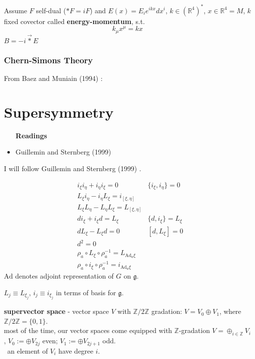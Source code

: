 \documentclass[10pt]{amsart}
\begin{document}
\begin{multicols*}{2}
Assume $F$ self-dual ($*F = iF$) and $E(x) = E_i e^{ikx} dx^i$, $k \in (\mathbb{R}^4)^*$, $x\in \mathbb{R}^4 = M$, $k$ fixed covector called \textbf{energy-momentum}, s.t. 
\[
k_{\mu} x^{\mu} = kx
\]
$B= -i \vec{*} E$




\section{Chern-Simons Theory}

From Baez and Muniain (1994) \cite{JBaezJMuniain1994}: 

\part{Supersymmetry}


\begin{itemize}
  \item [\textbf{Readings}]
  \item Guillemin and Sternberg (1999) \cite{GS1999}
\end{itemize}

I will follow Guillemin and Sternberg (1999) \cite{GS1999}.  

\begin{equation}
  \begin{aligned}
    & i_{\xi } i_{\eta} + i_{\eta} i_{\xi} = 0  \qquad \, & \lbrace i_{\xi} ,  i_{\eta} \rbrace =0  \\
    & L_{\xi} i_{\eta} - i_{\eta} L_{\xi} = i_{[\xi, \eta] } & \\
    & L_{\xi} L_{\eta} - L_{\eta} L_{\xi} = L_{[\xi, \eta] } & \\
    & d i_{\xi} + i_{\xi} d = L_{\xi } & \lbrace d,i_{\xi} \rbrace = L_{\xi} \\
    & dL_{\xi}  -  L_{\xi}d = 0 &  [d, L_{\xi} ] = 0 \\ 
    & d^2 = 0 & \\
    & \rho_a \circ L_{\xi} \circ \rho_a^{-1} = L_{\text{Ad}_a\xi}  & \\ 
    & \rho_a \circ i_{\xi} \circ \rho_a^{-1} = i_{\text{Ad}_a\xi}  & 
\end{aligned}
\end{equation}
$\text{Ad}$ denotes adjoint representation of $G$ on $\mathfrak{g}$.  

$L_j \equiv L_{\xi_j}$, $i_j \equiv i_{\xi_j}$ in terms of basis for $\mathfrak{g}$.  

\textbf{supervector space} - vector space $V$ with $\mathbb{Z}/2\mathbb{Z}$ gradation: $V =V_0 \oplus V_1$, where $\mathbb{Z}/2\mathbb{Z} = \lbrace 0 ,1 \rbrace$.  \\
most of the time, our vector spaces come equipped with $\mathbb{Z}$-gradation $V = \oplus_{i\in \mathbb{Z}}V_i$, $V_0 := \oplus V_{2j}$ even; $V_1 := \oplus V_{2j+1}$ odd.  \\
\qquad \, an element of $V_i$ have degree $i$.  


\end{multicols*}
\end{document}
